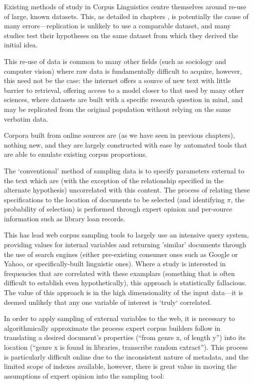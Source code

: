 

Existing methods of study in Corpus Linguistics centre themselves around re-use of large, known datasets.  This, as detailed in chapters , is potentially the cause of many errors---replication is unlikely to use a comparable dataset, and many studies test their hypotheses on the same dataset from which they derived the initial idea.

This re-use of data is common to many other fields (such as sociology and computer vision) where raw data is fundamentally difficult to acquire, however, this need not be the case: the internet offers a source of new text with little barrier to retrieval, offering access to a model closer to that used by many other sciences, where datasets are built with a specific research question in mind, and may be replicated from the original population without relying on the same verbatim data.

Corpora built from online sources are (as we have seen in previous chapters), nothing new, and they are largely constructed with ease by automated tools that are able to emulate existing corpus proportions.  

The `conventional' method of sampling data is to specify parameters external to the text which are (with the exception of the relationship specified in the alternate hypothesis) uncorrelated with this content.  The process of relating these specifications to the location of documents to be selected (and identifying $\pi$, the probability of selection) is performed through expert opinion and per-source information such as library loan records.

This has lead web corpus sampling tools to largely use an intensive query system, providing values for internal variables and returning 'similar' documents through the use of search engines (either pre-existing consumer ones such as Google or Yahoo, or specifically-built linguistic ones).  Where a study is interested in frequencies that are correlated with these examplars (something that is often difficult to establish even hypothetically), this approach is statistically fallacious.  The value of this approach is in the high dimensionality of the input data---it is deemed unlikely that any one variable of interest is `truly` correlated.


In order to apply sampling of external variables to the web, it is necessary to algorithmically approximate the process expert corpus builders follow in translating a desired document's properties (``from genre x, of length y'') into its location (``genre x is found in libraries, transcribe random extract'').  This process is particularly difficult online due to the inconsistent nature of metadata, and the limited scope of indexes available, however, there is great value in moving the assumptions of expert opinion into the sampling tool:

